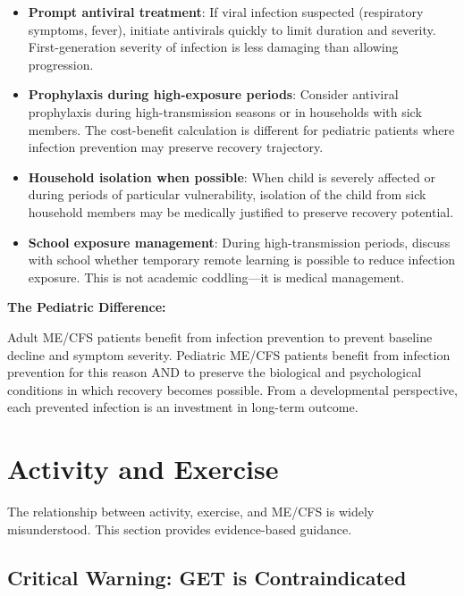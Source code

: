 \begin{observation}
\begin{itemize}
    \item \textbf{Prompt antiviral treatment}: If viral infection suspected (respiratory symptoms, fever), initiate antivirals quickly to limit duration and severity. First-generation severity of infection is less damaging than allowing progression.

    \item \textbf{Prophylaxis during high-exposure periods}: Consider antiviral prophylaxis during high-transmission seasons or in households with sick members. The cost-benefit calculation is different for pediatric patients where infection prevention may preserve recovery trajectory.

    \item \textbf{Household isolation when possible}: When child is severely affected or during periods of particular vulnerability, isolation of the child from sick household members may be medically justified to preserve recovery potential.

    \item \textbf{School exposure management}: During high-transmission periods, discuss with school whether temporary remote learning is possible to reduce infection exposure. This is not academic coddling---it is medical management.
\end{itemize}

\textbf{The Pediatric Difference:}

Adult ME/CFS patients benefit from infection prevention to prevent baseline decline and symptom severity. Pediatric ME/CFS patients benefit from infection prevention for this reason AND to preserve the biological and psychological conditions in which recovery becomes possible. From a developmental perspective, each prevented infection is an investment in long-term outcome.

\end{observation}

\section{Activity and Exercise}
\label{sec:ped-activity-exercise}

The relationship between activity, exercise, and ME/CFS is widely misunderstood. This section provides evidence-based guidance.

\subsection{Critical Warning: GET is Contraindicated}
\label{subsec:ped-get-warning}


